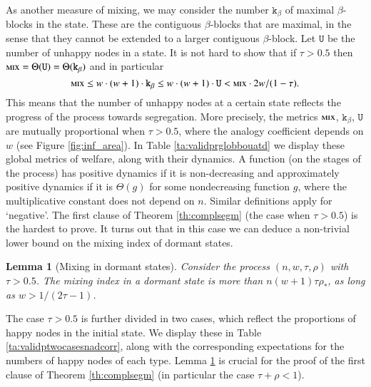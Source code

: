 \documentclass[11pt]{article}
\theoremstyle{plain}
\newtheorem{lem}[thm]{Lemma}
\numberwithin{equation}{subsection}
\newcommand{\mix}{\textsc{mix}}
\newcommand{\unhap}{\mathtt{U}}
\newcommand{\blockb}{\mathtt{k}_{\beta}}
\begin{document}
As another measure of mixing, we may consider the number
$\mathtt{k}_{\beta}$ of maximal $\beta$-blocks in the state. These are the contiguous $\beta$-blocks
that are maximal, in the sense that they cannot be extended to a larger contiguous $\beta$-block.
Let $\unhap$ be the number of unhappy nodes in a state.
It is not hard to show that if $\tau>0.5$  then $\mix=\Theta(\unhap)=\Theta(\mathtt{k}_{\beta})$ and in particular
\begin{equation}\label{eq:finalumixkrel}
\mix \leq w\cdot (w+1) \cdot \mathtt{k}_{\beta} \leq w\cdot (w+1) \cdot \unhap < \mix\cdot 2w/(1-\tau). \end{equation}
This means that the number of unhappy nodes at a certain state reflects
the progress of the process towards segregation.
More precisely,
the metrics $\mix$, $\blockb$, $\unhap$ are mutually proportional when
$\tau>0.5$, where the analogy coefficient depends on $w$ (see Figure \ref{fig:inf_area}). 
In Table \ref{ta:validprglobbouatd} we display these global metrics of welfare,
along with their dynamics. A function (on the stages of the process) 
has positive dynamics if it is non-decreasing
and approximately positive dynamics if it
is $\Theta(g)$ for some nondecreasing function $g$, where the multiplicative constant does not depend on $n$.
Similar definitions apply for `negative'.
The first clause of Theorem \ref{th:complsegm} (the case when $\tau>0.5$)
is the hardest to prove. 
It turns out that in this case  we can
deduce a non-trivial lower bound on the mixing index of dormant states.
\begin{lem}[Mixing in dormant states]\label{le:mixindorsta}
Consider the process $(n, w, \tau, \rho)$ with $\tau>0.5$. The  
mixing index in a dormant state is more than $n(w+1)\tau\rho_{\ast}$,
as long as $w>1/(2\tau-1)$.
\end{lem}

The case $\tau>0.5$ is further divided in two cases, which reflect the
proportions of happy nodes in the initial state. We display these in 
Table \ref{ta:validptwocasesnadcorr}, along with the corresponding 
expectations for the numbers of happy nodes of each type.
Lemma \ref{le:mixindorsta} is crucial  
for the proof of the first clause of Theorem \ref{th:complsegm}
(in particular the  case $\tau+\rho<1$).
\end{document}
